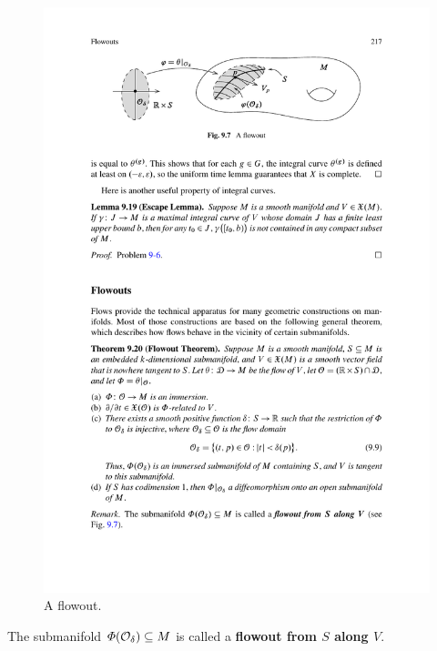 \begin{figure}[htbp]
\centering
\includegraphics{pictures/flowout}
\caption{A flowout.}
\end{figure}
\begin{remark}
The submanifold $\varPhi({\mathcal{O}_\delta})\subseteq M$ is called a \textbf{flowout from $S$ along $V$}.
\end{remark}
